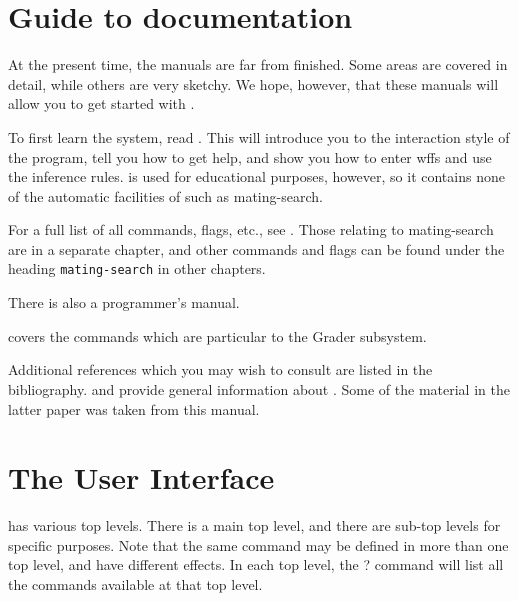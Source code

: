 \documentclass[10pt,twoside]{book}
\begin{document}
\section{Guide to documentation}

At the present time, the {\TPS} manuals are far from finished.  Some areas
are covered in detail, while others are very sketchy.  We hope, however,
that these manuals 
will allow you to get started with {\TPS}.

To first learn the system, read \cite{AndrewsTPS88b}.  This will introduce
you to the interaction style of the program, tell you how to get
help, and show you how to enter wffs and use the inference rules.
{\ETPS} is used for educational purposes, however, so it contains none
of the automatic facilities of {\TPS} such as mating-search.

For a full list of all commands, flags, etc., see \cite{AndrewsTPS88d}.  Those
relating to mating-search are in a separate chapter, and other commands
and flags can be found under the heading {\tt mating-search} in other
chapters.

There is also a programmer's manual. 


\cite{AndrewsTPS88c} covers the commands which are particular to the
Grader subsystem.

Additional references which you may wish to consult are listed in the
bibliography. \cite{Andrews95b} and \cite{AndrewsBrown2005} provide
general information about {\TPS}. Some of the material in 
the latter paper was taken from this manual.



\section{The {\TPS} User Interface}\label{user-int}


{\TPS} has various top levels.  There is a main top level, and
there are sub-top levels for specific
purposes. Note that the same command may be defined in more than one top level,
and have different effects. In each top level, the ? command will list
all the commands available at that top level.

\end{document}

